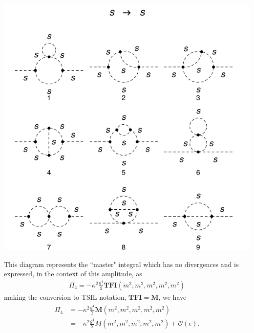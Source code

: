 \documentclass[11pt]{article}
\newcommand{\tsil}{\textsf{TSIL} \! }
\begin{document}
\noindent\begin{minipage}{0.3\textwidth}
\begin{center}
\includegraphics{2loop_4.pdf}
\end{center}
\end{minipage}
\noindent\begin{minipage}{0.7\textwidth}
This diagram represents the ``master" integral which has no divergences and is expressed, in the context of this amplitude, as
\begin{align}
\Pi_4 = -\kappa^2 \frac{g^4}{2} \mathbf{TFI}(m^2,m^2,m^2,m^2,m^2)
\end{align}
making the conversion to \tsil notation, $\mathbf{TFI}=\mathbf{M}$, we have
\begin{align}
\begin{split}
\Pi_4 &= - \kappa^2 \frac{g^4}{2} \mathbf{M}(m^2,m^2,m^2,m^2,m^2)\\&=- \kappa^2 \frac{g^4}{2} M(m^2,m^2,m^2,m^2,m^2)+\mathcal{O}(\epsilon).
\end{split}
\end{align}
\end{minipage}
\end{document}
